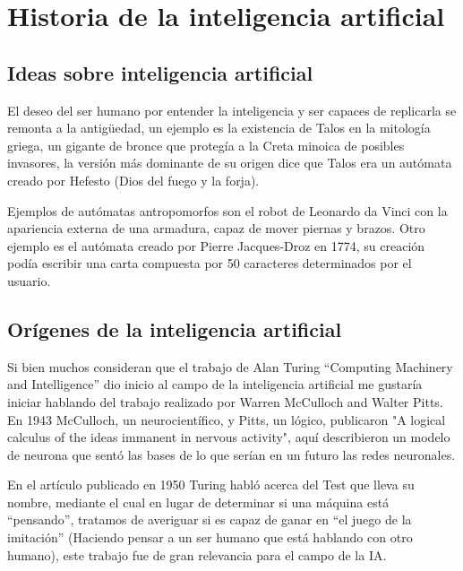 \documentclass[11pt,fleqn]{book} %
\begin{document}


\chapter{Historia de la inteligencia artificial}

\section{Ideas sobre inteligencia artificial}

El deseo del ser humano por entender la inteligencia y ser capaces de replicarla se remonta a la antigüedad, un ejemplo es la existencia de Talos en la mitología griega, un gigante de bronce que protegía a la Creta minoica de posibles invasores, la versión más dominante de su origen dice que Talos era un autómata creado por Hefesto (Dios del fuego y la forja).

Ejemplos de autómatas antropomorfos son el robot de Leonardo da Vinci con la apariencia externa de una armadura, capaz de mover piernas y brazos. Otro ejemplo es el autómata creado por Pierre Jacques-Droz en 1774, su creación podía escribir una carta compuesta por 50 caracteres determinados por el usuario.


\section{Orígenes de la inteligencia artificial}

Si bien muchos consideran que el trabajo de Alan Turing “Computing Machinery and Intelligence” \cite{turing_compmach} dio inicio al campo de la inteligencia artificial me gustaría iniciar hablando del trabajo realizado por Warren McCulloch and Walter Pitts. En 1943 McCulloch, un neurocientífico, y Pitts, un lógico, publicaron "A logical calculus of the ideas immanent in nervous activity", aquí describieron un modelo de neurona que sentó las bases de lo que serían en un futuro las redes neuronales.

En el artículo publicado en 1950 Turing habló acerca del Test que lleva su nombre, mediante el cual en lugar de determinar si una máquina está “pensando”, tratamos de averiguar si es capaz de ganar en “el juego de la imitación” (Haciendo pensar a un ser humano que está hablando con otro humano), este trabajo fue de gran relevancia para el campo de la IA.
\end{document}
